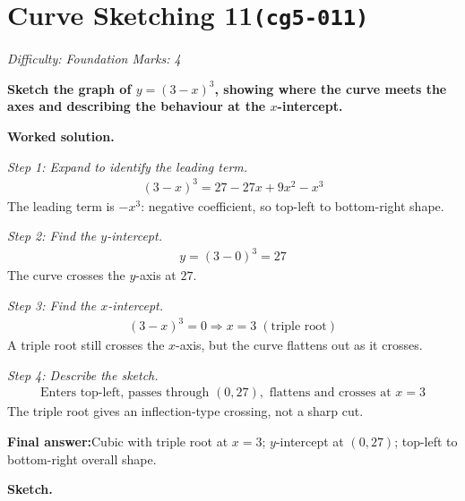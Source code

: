 \documentclass[11pt]{article}
\newcommand{\question}[1]{\par\medskip\noindent\textbf{#1}\par}
\begin{document}
\section*{Curve Sketching 11\quad\small\texttt{(cg5-011)}}
\textit{Difficulty: Foundation \quad\textbar\quad Marks: 4}

\question{Sketch the graph of \( y = (3 - x)^3 \), showing where the curve meets the axes and describing the behaviour at the \( x \)-intercept.}

\textbf{Worked solution.}

\textit{Step 1: Expand to identify the leading term.}
\[\begin{gathered}
(3-x)^3 = 27 - 27x + 9x^2 - x^3
\end{gathered}\]
The leading term is \( -x^3 \): negative coefficient, so top-left to bottom-right shape.

\textit{Step 2: Find the \( y \)-intercept.}
\[\begin{gathered}
y = (3-0)^3 = 27
\end{gathered}\]
The curve crosses the \( y \)-axis at \( 27 \).

\textit{Step 3: Find the \( x \)-intercept.}
\[\begin{gathered}
(3 - x)^3 = 0 \Rightarrow x = 3 \;(\text{triple root})
\end{gathered}\]
A triple root still crosses the \( x \)-axis, but the curve flattens out as it crosses.

\textit{Step 4: Describe the sketch.}
\[\begin{gathered}
\text{Enters top-left, passes through } (0, 27), \text{ flattens and crosses at } x = 3
\end{gathered}\]
The triple root gives an inflection-type crossing, not a sharp cut.

\begin{answerbox}
\textbf{Final answer:}\quad Cubic with triple root at \(\displaystyle x = 3\); \(\displaystyle y\)-intercept at \(\displaystyle (0, 27)\); top-left to bottom-right overall shape.
\end{answerbox}
\textbf{Sketch.}
\end{document}
